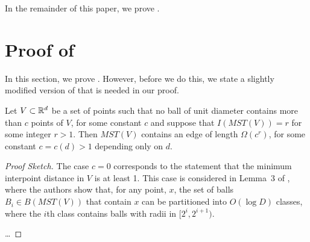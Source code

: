 \documentclass{patmorin}
\newcommand{\mst}{\mathit{MST}}
\begin{document}
In the remainder of this paper, we prove .

\section{Proof of }

In this section, we prove .  However, before we do this,
we state a slightly modified version of  that is needed in
our proof.

\begin{lem}
  Let $V\subset\mathbb{R}^d$ be a set of points such that no ball of unit
  diameter contains more than $c$ points of $V$, for some constant $c$
  and suppose that $I(MST(V))=r$ for some integer $r>1$.  Then $MST(V)$
  contains an edge of length $\Omega(c^r)$, for some constant $c=c(d)>1$
  depending only on $d$.
\end{lem}

\begin{proof}[Proof Sketch]
The case $c=0$ corresponds to the statement that the minimum interpoint
distance in $V$ is at least 1.  This case is considered in Lemma~3 of
\cite{msz11}, where the authors show that, for any point, $x$, the set
of balls $B_i\in B(\mst(V))$ that contain $x$ can be partitioned into
$O(\log D)$ classes, where the $i$th class contains balls with radii
in $[2^i,2^{i+1})$.

\noindent\ldots
\end{proof}
\end{document}
